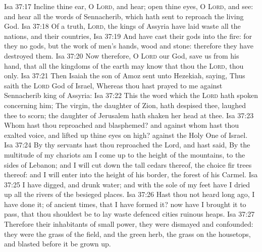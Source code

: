 \vs Isa 37:17 Incline thine ear, O \textsc{Lord}, and hear; open thine eyes, O \textsc{Lord}, and see: and hear all the words of Sennacherib, which hath sent to reproach the living God.
\vs Isa 37:18 Of a truth, \textsc{Lord}, the kings of Assyria have laid waste all the nations, and their countries,
\vs Isa 37:19 And have cast their gods into the fire: for they  no gods, but the work of men's hands, wood and stone: therefore they have destroyed them.
\vs Isa 37:20 Now therefore, O \textsc{Lord} our God, save us from his hand, that all the kingdoms of the earth may know that thou  the \textsc{Lord},  thou only.
\vs Isa 37:21 Then Isaiah the son of Amoz sent unto Hezekiah, saying, Thus saith the \textsc{Lord} God of Israel, Whereas thou hast prayed to me against Sennacherib king of Assyria:
\vs Isa 37:22 This  the word which the \textsc{Lord} hath spoken concerning him; The virgin, the daughter of Zion, hath despised thee,  laughed thee to scorn; the daughter of Jerusalem hath shaken her head at thee.
\vs Isa 37:23 Whom hast thou reproached and blasphemed? and against whom hast thou exalted  voice, and lifted up thine eyes on high?  against the Holy One of Israel.
\vs Isa 37:24 By thy servants hast thou reproached the Lord, and hast said, By the multitude of my chariots am I come up to the height of the mountains, to the sides of Lebanon; and I will cut down the tall cedars thereof,  the choice fir trees thereof: and I will enter into the height of his border,  the forest of his Carmel.
\vs Isa 37:25 I have digged, and drunk water; and with the sole of my feet have I dried up all the rivers of the besieged places.
\vs Isa 37:26 Hast thou not heard long ago,  I have done it;  of ancient times, that I have formed it? now have I brought it to pass, that thou shouldest be to lay waste defenced cities  ruinous heaps.
\vs Isa 37:27 Therefore their inhabitants  of small power, they were dismayed and confounded: they were  the grass of the field, and  the green herb,  the grass on the housetops, and  blasted before it be grown up.
